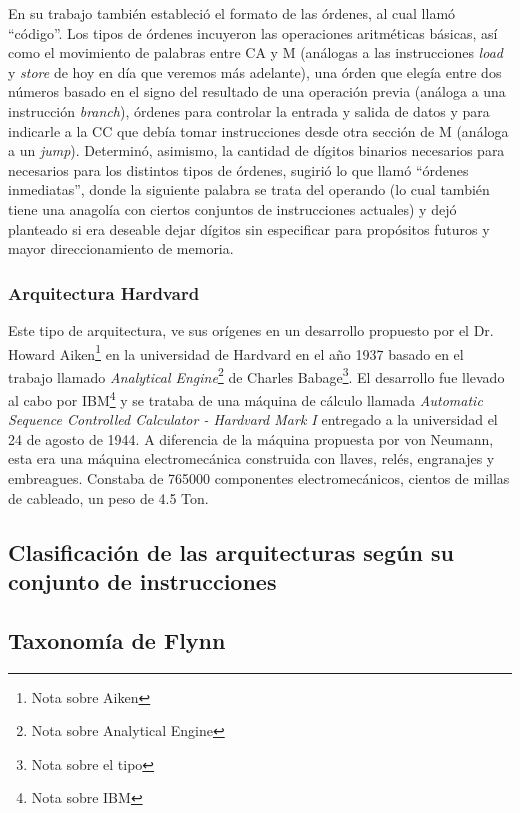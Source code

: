 En su trabajo también estableció el formato de las órdenes, al cual llamó ``código''. Los tipos de órdenes incuyeron las operaciones aritméticas básicas, así como el movimiento de palabras entre CA y M (análogas a las instrucciones \emph{load} y \emph{store} de hoy en día que veremos más adelante), una órden que elegía entre dos números basado en el signo del resultado de una operación previa (análoga a una instrucción \emph{branch}), órdenes para controlar la entrada y salida de datos y para indicarle a la CC que debía tomar instrucciones desde otra sección de M (análoga a un \emph{jump}). Determinó, asimismo, la cantidad de dígitos binarios necesarios para necesarios para los distintos tipos de órdenes, sugirió lo que llamó ``órdenes inmediatas'', donde la siguiente palabra  se trata del operando (lo cual también tiene una anagolía con ciertos conjuntos de instrucciones actuales) y dejó planteado si era deseable dejar dígitos sin especificar para propósitos futuros y mayor direccionamiento de memoria.

\subsubsection{Arquitectura Hardvard}

Este tipo de arquitectura, ve sus orígenes en un desarrollo propuesto por el Dr. Howard Aiken\footnote{Nota sobre Aiken} en la universidad de Hardvard en el año 1937 basado en el trabajo llamado \emph{Analytical Engine}\footnote{Nota sobre Analytical Engine} de Charles Babage\footnote{Nota sobre el tipo}. El desarrollo fue llevado al cabo por IBM\footnote{Nota sobre IBM} y se trataba de una máquina de cálculo llamada \emph{Automatic Sequence Controlled Calculator - Hardvard Mark I} entregado a la universidad el 24 de agosto de 1944. A diferencia de la máquina propuesta por von Neumann, esta era una máquina electromecánica construida con llaves, relés, engranajes y embreagues. Constaba de 765000 componentes electromecánicos, cientos de millas de cableado, un peso de 4.5 Ton.

\subsection{Clasificación de las arquitecturas según su conjunto de instrucciones}

\subsection{Taxonomía de Flynn}

